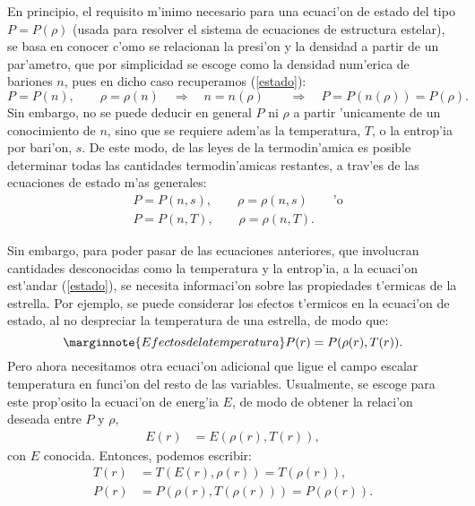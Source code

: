 En principio, el requisito m'inimo necesario para una ecuaci'on de estado del tipo $P=P(\rho)$ (usada para resolver el sistema de ecuaciones de estructura estelar), se basa en conocer c'omo se relacionan la presi'on y la densidad a partir de un par'ametro, que por simplicidad se escoge como la densidad num'erica de bariones $n$, pues en dicho caso recuperamos (\ref{estado}):
\begin{equation*}
 P=P(n),\qquad\rho=\rho(n)\quad\Rightarrow\quad n=n(\rho)\qquad\Rightarrow\quad P=P(n(\rho))=P(\rho).
\end{equation*}
Sin embargo, no se puede deducir en general $P$ ni $\rho$ a partir 'unicamente de un conocimiento de $n$, sino que se requiere adem'as la temperatura, $T$, o la entrop'ia por bari'on, $s$. De este modo, de las leyes de la termodin'amica es posible determinar todas las cantidades termodin'amicas restantes, a trav'es de las ecuaciones de estado m'as generales:
\begin{align}\label{estadogeneral}
 &P=P(n,s),\qquad\rho=\rho(n,s)\qquad\text{'o}\\
&P=P(n,T),\qquad\rho=\rho(n,T).
\end{align}

Sin embargo, para poder pasar de las ecuaciones anteriores, que involucran cantidades desconocidas como la temperatura  y la entrop'ia, a la ecuaci'on est'andar (\ref{estado}), se necesita informaci'on sobre las propiedades t'ermicas de la estrella. Por ejemplo, se puede considerar los efectos t'ermicos en la ecuaci'on de estado, al no  despreciar la temperatura de una estrella, de modo que:
\begin{equation}\marginnote{Efectos de la temperatura}
 P(r)=P(\rho(r),T(r)).
\end{equation}
Pero ahora necesitamos otra ecuaci'on adicional que ligue el campo escalar temperatura en funci'on del resto de las variables. Usualmente, se escoge para este prop'osito la ecuaci'on de energ'ia $E$, de modo de obtener la relaci'on deseada entre $P$ y $\rho$,
\begin{align}
 E(r)&=E(\rho(r),T(r)),
\end{align}
con $E$ conocida. Entonces, podemos escribir:
\begin{align}
T(r)&=T(E(r),\rho(r))=T(\rho(r)),\\
P(r)&=P(\rho(r),T(\rho(r)))=P(\rho(r)).
\end{align}

